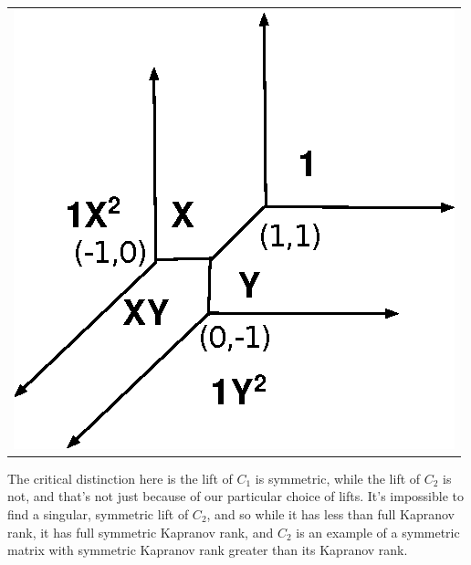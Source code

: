 \documentclass{article}
\begin{document}
\vspace{.1 in}
\begin{tabular}{c}
  \centering
  \hspace{1in}\includegraphics[scale=1]{Nonsingular-Tropical-Conic.eps}
\end{tabular}

The critical distinction here is the lift of $C_{1}$ is symmetric, while the lift of $C_{2}$ is not, and that's not just because of our particular choice of lifts. It's impossible to find a singular, symmetric lift of $C_{2}$, and so while it has less than full Kapranov rank, it has full symmetric Kapranov rank, and $C_{2}$ is an example of a symmetric matrix with symmetric Kapranov rank greater than its Kapranov rank. 
\end{document}
